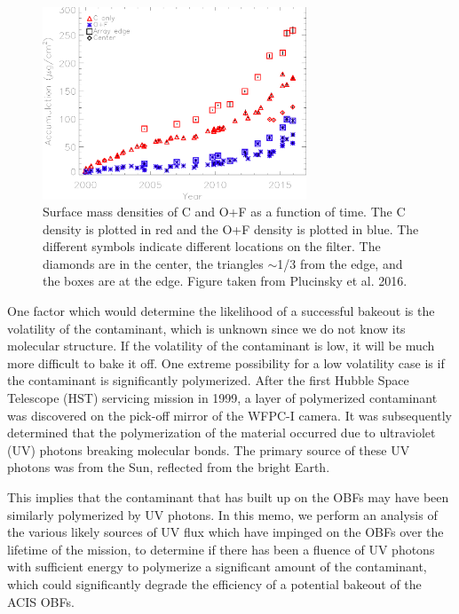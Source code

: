 \documentclass[11pt]{article}
\begin{document}
\begin{figure}
\begin{center}
\includegraphics[width=0.7\textwidth]{surface_mass_density.eps}
\caption{Surface mass densities of C and O+F as a function of time. The C density is plotted in red and the O+F density is plotted in blue. The different symbols indicate different locations on the filter. The diamonds are in the center, the triangles $\sim$1/3 from the edge, and the boxes are at the edge. Figure taken from Plucinsky et al. 2016.\label{fig:surface_mass_density}}
\end{center}
\end{figure}

One factor which would determine the likelihood of a successful bakeout is the volatility
of the contaminant, which is unknown since we do not know its molecular structure. If the
volatility of the contaminant is low, it will be much more difficult to bake it off. One
extreme possibility for a low volatility case is if the contaminant is significantly polymerized.
After the first Hubble Space Telescope (HST) servicing mission in 1999, a layer of polymerized
contaminant was discovered on the pick-off mirror of the WFPC-I camera. It was subsequently
determined that the polymerization of the material occurred due to ultraviolet (UV) photons
breaking molecular bonds. The primary source of these UV photons was from the Sun, reflected
from the bright Earth.

This implies that the contaminant that has built up on the OBFs may have been similarly
polymerized by UV photons. In this memo, we perform an analysis of the various likely
sources of UV flux which have impinged on the OBFs over the lifetime of the mission,
to determine if there has been a fluence of UV photons with sufficient energy to polymerize
a significant amount of the contaminant, which could significantly degrade the efficiency
of a potential bakeout of the ACIS OBFs.
\end{document}
